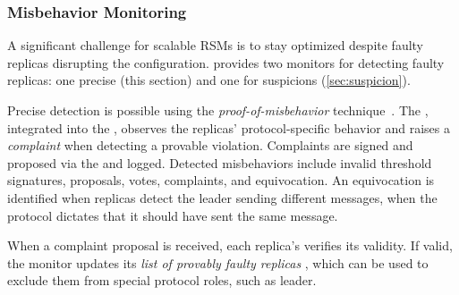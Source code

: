 \subsubsection{Misbehavior Monitoring}
\label{sec:mms}

A significant challenge for scalable RSMs is to stay optimized despite faulty replicas disrupting the configuration.
\sysname provides two monitors for detecting faulty replicas: one precise (this section) and one for suspicions (\cref{sec:suspicion}).

Precise detection is possible using the \textit{proof-of-misbehavior} technique~\cite{ia-ccf, BFTFD, byzid,zyzzyva, prime}.
The \missensor, integrated into the \consmod, observes the replicas' protocol-specific behavior and raises a \textit{complaint} when detecting a provable violation.
Complaints are signed and proposed via the \sensapp and logged.
Detected misbehaviors include invalid threshold signatures, proposals, votes, complaints, and equivocation.
An equivocation is identified when replicas detect the leader sending different messages, when the protocol dictates that it should have sent the same message.

When a complaint proposal is received, each replica's \mismonitor verifies its validity.
If valid, the monitor updates its \textit{list of provably faulty replicas} \Faulty, which can be used to exclude them from special protocol roles, such as leader.





